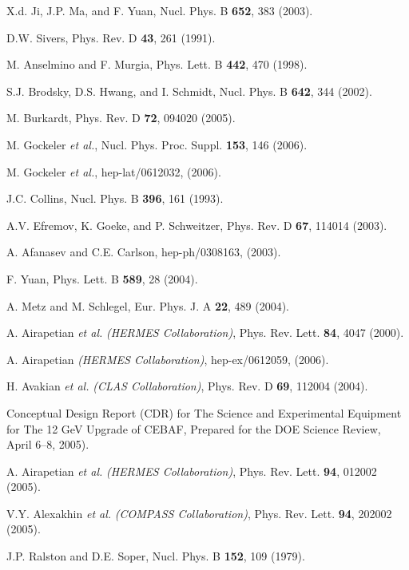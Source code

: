 \begin{thebibliography}{199}
X.d. Ji, J.P. Ma, and F. Yuan, Nucl. Phys. B {\bf 652}, 383 (2003).

D.W. Sivers, Phys. Rev. D {\bf 43}, 261 (1991).

M. Anselmino and F. Murgia, Phys. Lett. B {\bf 442}, 470 (1998).

S.J. Brodsky, D.S. Hwang, and I. Schmidt, Nucl. Phys. B {\bf 642},
344 (2002).

M. Burkardt, Phys. Rev. D {\bf 72}, 094020 (2005).

M. Gockeler {\it et al.}, Nucl. Phys. Proc. Suppl. {\bf 153}, 146 (2006).

M. Gockeler {\it et al.}, hep-lat/0612032, (2006).

J.C. Collins, Nucl. Phys. B {\bf 396}, 161 (1993).

A.V. Efremov, K. Goeke, and P. Schweitzer, Phys. Rev. D {\bf 67}, 114014
(2003).

A. Afanasev and C.E. Carlson, hep-ph/0308163, (2003).

F. Yuan, Phys. Lett. B {\bf 589}, 28 (2004).

A. Metz and M. Schlegel, Eur. Phys. J. A {\bf 22}, 489 (2004).

A. Airapetian {\it et al.} {\it (HERMES Collaboration)}, Phys. Rev. Lett. 
{\bf 84}, 4047 (2000).

A. Airapetian {\it (HERMES Collaboration)}, hep-ex/0612059, (2006).

H. Avakian {\it et al.} {\it (CLAS Collaboration)}, Phys. Rev. D {\bf 69},
112004 (2004).

Conceptual Design Report (CDR) for The Science and Experimental Equipment for
The 12 GeV Upgrade of CEBAF, Prepared for the DOE Science Review, 
April 6--8, 2005).

A. Airapetian {\it et al.} {\it (HERMES Collaboration)}, Phys. Rev. Lett. 
{\bf 94}, 012002 (2005).

V.Y. Alexakhin {\it et al.} {\it (COMPASS Collaboration)}, Phys. Rev. Lett. 
{\bf 94}, 202002 (2005).

J.P. Ralston and D.E. Soper, Nucl. Phys. B {\bf 152}, 109 (1979).


\end{thebibliography}
